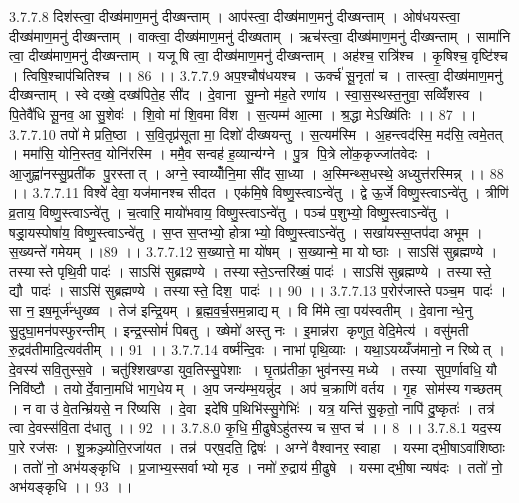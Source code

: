 3.7.7.8
दिश॑स्त्वा॒ दीख्ष॑माण॒मनु॑ दीख्षन्ताम् । आप॑स्त्वा॒ दीख्ष॑माण॒मनु॑ दीख्षन्ताम् । ओष॑धयस्त्वा॒ दीख्ष॑माण॒मनु॑ दीख्षन्ताम् । वाक्त्वा॒ दीख्ष॑माण॒मनु॑ दीख्षताम् । ऋच॑स्त्वा॒ दीख्ष॑माण॒मनु॑ दीख्षन्ताम् । सामा॑नि त्वा॒ दीख्ष॑माण॒मनु॑ दीख्षन्ताम् । यजू॑षि त्वा॒ दीख्ष॑माण॒मनु॑ दीख्षन्ताम् । अह॑श्च॒ रात्रि॑श्च । कृ॒षिश्च॒ वृष्टि॑श्च । त्विषि॒श्चाप॑चितिश्च ।। 86 ।।
3.7.7.9
अप॒श्चौष॑धयश्च । ऊर्क्च॑ सू॒नृता॑ च । तास्त्वा॒ दीख्ष॑माण॒मनु॑ दीख्षन्ताम् । स्वे दख्षे॒ दख्ष॑पिते॒ह सी॑द । दे॒वाना॑ सु॒म्नो म॑ह॒ते रणा॑य । स्वा॒स॒स्थस्त॒नुवा॒ सव्विँ॑शस्व । पि॒तेवै॑धि सू॒नव॒ आ सु॒शेवः॑ । शि॒वो मा॑ शि॒वमा वि॑श । स॒त्यम्म॑ आ॒त्मा । श्र॒द्धा मेऽख्षि॑तिः ।। 87 ।।
3.7.7.10
तपो॑ मे प्रति॒ष्ठा । स॒वि॒तृप्र॑सूता मा॒ दिशो॑ दीख्षयन्तु । स॒त्यम॑स्मि । अ॒हन्त्वद॑स्मि॒ मद॑सि॒ त्वमे॒तत् । ममा॑सि॒ योनि॒स्तव॒ योनि॑रस्मि । ममै॒व सन्वह॑ ह॒व्यान्य॑ग्ने । पु॒त्र पि॒त्रे लो॑क॒कृज्जा॑तवेदः । आ॒जुह्वा॑नस्सु॒प्रती॑क पु॒रस्तात् । अग्ने॒ स्वाय्योँनि॒मा सी॑द सा॒ध्या । अ॒स्मिन्थ्स॒धस्थे॒ अध्युत्त॑रस्मिन्न् ।। 88 ।।
3.7.7.11
विश्वे॑ देवा॒ यज॑मानश्च सीदत । एक॑मि॒षे विष्णु॒स्त्वाऽन्वे॑तु । द्वे ऊ॒र्जे विष्णु॒स्त्वाऽन्वे॑तु । त्रीणि॑ व्र॒ताय॒ विष्णु॒स्त्वाऽन्वे॑तु । च॒त्वारि॒ मायो॑भवाय॒ विष्णु॒स्त्वाऽन्वे॑तु । पञ्च॑ प॒शुभ्यो॒ विष्णु॒स्त्वाऽन्वे॑तु । षड्रा॒यस्पोषा॑य॒ विष्णु॒स्त्वाऽन्वे॑तु । स॒प्त स॒प्तभ्यो॒ होत्राभ्यो॒ विष्णु॒स्त्वाऽन्वे॑तु । सखा॑यस्स॒प्तप॑दा अभूम । स॒ख्यन्ते॑ गमेयम् ।।89 ।।
3.7.7.12
स॒ख्यात्ते॒ मा यो॑षम् । स॒ख्यान्मे॒ मा योष्ठाः । साऽसि॑ सुब्रह्मण्ये । तस्यास्ते पृथि॒वी पादः॑ । साऽसि॑ सुब्रह्मण्ये । तस्यास्ते॒ऽन्तरि॑ख्षं॒ पादः॑ । साऽसि॑ सुब्रह्मण्ये । तस्यास्ते॒ द्यौ पादः॑ । साऽसि॑ सुब्रह्मण्ये । तस्यास्ते॒ दिश॒ पादः॑ ।। 90 ।।
3.7.7.13
प॒रोर॑जास्ते पञ्च॒म पादः॑ । सा न॒ इष॒मूर्ज॑न्धुख्ष्व । तेज॑ इन्द्रि॒यम् । ब्र॒ह्म॒व॒र्च॒सम॒न्नाद्यम् । वि मि॑मे त्वा॒ पय॑स्वतीम् । दे॒वानान्धे॒नु सु॒दुघा॒मन॑पस्फुरन्तीम् । इन्द्र॒स्सोमं॑ पिबतु । ख्षेमो॑ अस्तु नः । इ॒मान्न॑रा कृणुत॒ वेदि॒मेत्य॑ । वसु॑मती रु॒द्रव॑तीमादि॒त्यव॑तीम् ।। 91 ।।
3.7.7.14
वर्ष्म॑न्दि॒वः । नाभा॑ पृथि॒व्याः । यथा॒ऽयय्यँज॑मानो॒ न रिष्येत् । दे॒वस्य॑ सवि॒तुस्स॒वे । चतु॑श्शिखण्डा युव॒तिस्सु॒पेशाः । घृ॒तप्र॑तीका॒ भुव॑नस्य॒ मध्ये । तस्या॑ सुप॒र्णावधि॒ यौ निवि॑ष्टौ । तयोर्दे॒वाना॒मधि॑ भाग॒धेयम् । अ॒प जन्य॑म्भ॒यन्नु॑द । अप॑ च॒क्राणि॑ वर्तय । गृ॒ह सोम॑स्य गच्छतम् । न वा उ॑ वे॒तन्म्रि॑यसे॒ न रि॑ष्यसि । दे॒वा इदे॑षि प॒थिभि॑स्सु॒गेभिः॑ । यत्र॒ यन्ति॑ सु॒कृतो॒ नापि॑ दु॒ष्कृतः॑ । तत्र॑ त्वा दे॒वस्स॑वि॒ता द॑धातु ।। 92 ।।
3.7.8.0
कृ॒धि॒ मी॒ढुषेऽहु॑तस्य च स॒प्त च॑ ।। 8 ।।
3.7.8.1
यद॒स्य पा॒रे रज॑सः । शु॒क्रञ्ज्योति॒रजा॑यत । तन्न॑ पर्‌ष॒दति॒ द्विषः॑ । अग्ने॑ वैश्वानर॒ स्वाहा । यस्माद्भी॒षाऽवा॑शिष्ठाः । ततो॑ नो॒ अभ॑यङ्कृधि । प्र॒जाभ्य॒स्सर्वाभ्यो मृड । नमो॑ रु॒द्राय॑ मी॒ढुषे । यस्माद्भी॒षा न्यष॑दः । ततो॑ नो॒ अभ॑यङ्कृधि ।। 93 ।।

